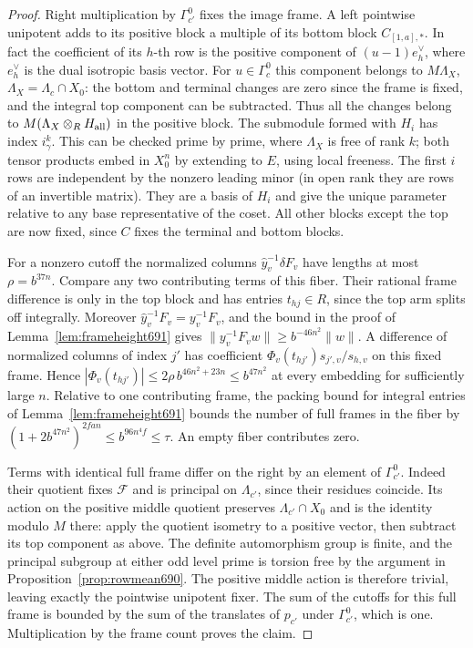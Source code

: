 \documentclass[a4paper,11pt]{article}
\theoremstyle{definition}
\theoremstyle{remark}
\numberwithin{equation}{section}
\begin{document}
\begin{proof}
Right multiplication by \(\Gamma_{c'}^0\) fixes the image
frame. A left pointwise unipotent adds to its positive block
a multiple of its bottom block \(C_{[1,a],*}\). In fact the
coefficient of its \(h\)-th row is the positive component of
\((u-1)e_h^\vee\), where \(e_h^\vee\) is the dual isotropic
basis vector. For \(u\in\Gamma_c^0\) this component belongs to
\(M\Lambda_X\), \(\Lambda_X=\Lambda_c\cap X_0\): the bottom
and terminal changes are zero since the frame is fixed, and
the integral top component can be subtracted. Thus all the
changes belong to \(M(\Lambda_X\otimes_R H_{\rm all})\)
in the positive block. The submodule formed with \(H_i\)
has index \(i_\gamma^k\). This can be checked prime by prime,
where \(\Lambda_X\) is free of rank \(k\); both tensor products
embed in \(X_0^n\) by extending to \(E\), using local freeness.
The first \(i\) rows are independent by the nonzero leading
minor (in open rank they are rows of an invertible matrix).
They are a basis of \(H_i\) and give the unique parameter
relative to any base representative of the coset. All other
blocks except the top are now fixed, since \(C\) fixes the
terminal and bottom blocks.

For a nonzero cutoff the normalized columns
\(\widehat y_v^{-1}\delta F_v\) have lengths at most
\(\rho=b^{37n}\). Compare any two contributing terms of this
fiber. Their rational frame difference is only in the top
block and has entries \(t_{hj}\in R\), since the top arm
splits off integrally. Moreover
\(\widehat y_v^{-1}F_v=y_v^{-1}F_v\), and the bound in the
proof of Lemma~\ref{lem:frameheight691} gives
\(\|y_v^{-1}F_v w\|\ge b^{-46n^2}\|w\|\). A difference of
normalized columns of index \(j'\) has coefficient
\(\Phi_v(t_{hj'})s_{j',v}/s_{h,v}\) on this fixed frame.
Hence \(|\Phi_v(t_{hj'})|\le2\rho\, b^{46n^2+23n}\le b^{47n^2}\)
at every embedding for sufficiently large \(n\). Relative to
one contributing frame, the packing bound for integral entries
of Lemma~\ref{lem:frameheight691} bounds the number of full
frames in the fiber by
\((1+2b^{47n^2})^{2fan}\le b^{96n^4 f}\le\tau\).
An empty fiber contributes zero.

Terms with identical full frame differ on the right by an
element of \(\Gamma_{c'}^0\). Indeed their quotient fixes
\(\mathcal F\) and is principal on \(\Lambda_{c'}\), since their
residues coincide. Its action on the positive middle quotient
preserves \(\Lambda_{c'}\cap X_0\) and is the identity modulo
\(M\) there: apply the quotient isometry to a positive vector,
then subtract its top component as above. The definite
automorphism group is finite, and the principal subgroup at
either odd level prime is torsion free by the argument in
Proposition~\ref{prop:rowmean690}. The positive middle action
is therefore trivial, leaving exactly the pointwise unipotent
fixer. The sum of the cutoffs for this full frame is bounded
by the sum of the translates of \(p_{c'}\) under \(\Gamma_{c'}^0\),
which is one. Multiplication by the frame count proves the claim.
\end{proof}
\end{document}
